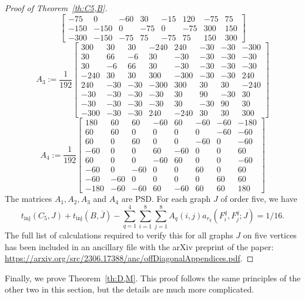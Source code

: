 \documentclass[12pt]{article}
\numberwithin{equation}{section}
\theoremstyle{definition}
\theoremstyle{remark}
\DeclareMathOperator{\inj}{inj}
\begin{document}
\begin{proof}[Proof of Theorem~\ref{th:C5,B}]
\[\begin{bmatrix}
-75 &0 &-60 &30 &-15 &120 &-75 &75\\
-150 &-150 &0 &-75 &0 &-75 &300 &150\\
-300 &-150 &-75 &75 &-75 &75 &150 &300 \end{bmatrix}\]
\[A_3:=\frac{1}{192}\begin{bmatrix}
300 &30 &30 &-240 &240 &-30 &-30 &-300\\
30 &66 &-6 &30 &-30 &-30 &-30 &-30\\
30 &-6 &66 &30 &-30 &-30 &-30 &-30\\
-240 &30 &30 &300 &-300 &-30 &-30 &240\\
240 &-30 &-30 &-300 &300 &30 &30 &-240\\
-30 &-30 &-30 &-30 &30 &90 &-30 &30\\
-30 &-30 &-30 &-30 &30 &-30 &90 &30\\
-300 &-30 &-30 &240 &-240 &30 &30 &300
\end{bmatrix}\]
\[A_4:=\frac{1}{192}\begin{bmatrix}
180 &60 &60 &-60 &60 &-60 &-60 &-180\\
60 &60 &0 &0 &0 &0 &-60 &-60\\
60 &0 &60 &0 &0 &-60 &0 &-60\\
-60 &0 &0 &60 &-60 &0 &0 &60\\
60 &0 &0 &-60 &60 &0 &0 &-60\\
-60 &0 &-60 &0 &0 &60 &0 &60\\
-60 &-60 &0 &0 &0 &0 &60 &60\\
-180 &-60 &-60 &60 &-60 &60 &60 &180
\end{bmatrix}\]
The matrices $A_1,A_2,A_3$ and $A_4$ are PSD. For each graph $J$ of order five, we have
\begin{equation}t_{\inj}(C_5,J) + t_{\inj}(B,\overline{J})-\sum_{q=1}^4\sum_{i=1}^{8}\sum_{j=1}^{8}A_q(i,j)a_{r_q}(F^q_i,F^q_j;J)=1/16.\end{equation}
The full list of calculations required to verify this for all graphs $J$ on five vertices has been included in an ancillary file with the arXiv preprint of the paper: \url{https://arxiv.org/src/2306.17388/anc/offDiagonalAppendices.pdf}. 
\end{proof}

Finally, we prove Theorem~\ref{th:D,M}. This proof follows the same principles of the other two in this section, but the details are much more complicated.
\end{document}
